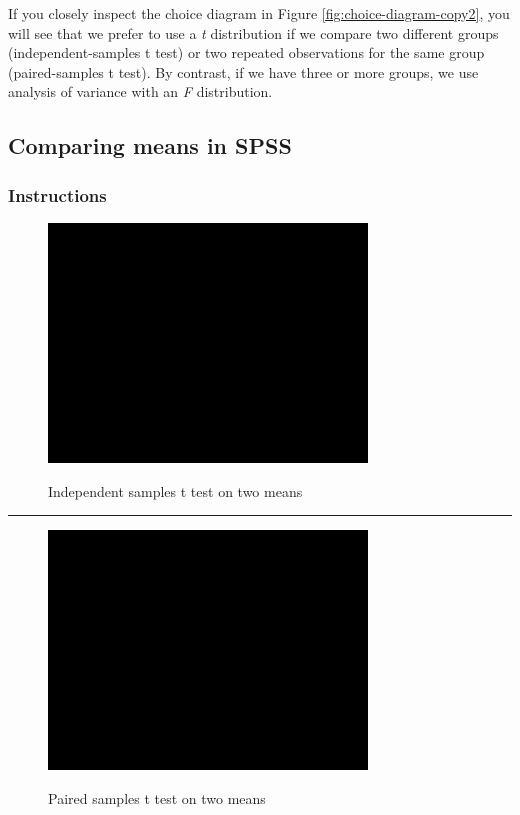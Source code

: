 \documentclass[a4paper]{book}
\theoremstyle{definition}
\theoremstyle{definition}
\theoremstyle{definition}
\theoremstyle{remark}
\begin{document}
If you closely inspect the choice diagram in Figure
\ref{fig:choice-diagram-copy2}, you will see that we prefer to use a
\emph{t} distribution if we compare two different groups
(independent-samples t test) or two repeated observations for the same
group (paired-samples t test). By contrast, if we have three or more
groups, we use analysis of variance with an \emph{F} distribution.

\subsection*{Comparing means in SPSS}\label{comparing-means-in-spss}

\subsubsection*{Instructions}\label{instructions-12}

\begin{figure}[H]
\href{https://www.youtube.com/embed/g4O0oTVm-Tk}{\includegraphics[width=320px]{GentleIntro_files/figure-latex/SPSSTindep-1} }\caption{Independent samples t test on two means}\label{fig:SPSSTindep}
\end{figure}

\begin{center}\rule{0.5\linewidth}{\linethickness}\end{center}

\begin{figure}[H]
\href{https://www.youtube.com/embed/7mGKG3mLqN0}{\includegraphics[width=320px]{GentleIntro_files/figure-latex/SPSSTpaired-1} }\caption{Paired samples t test on two means}\label{fig:SPSSTpaired}
\end{figure}
\end{document}
